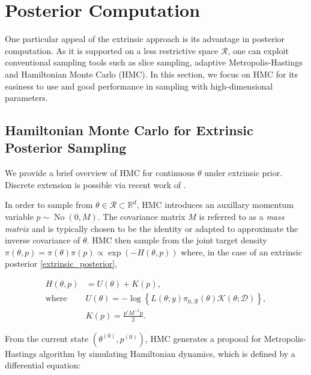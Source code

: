 \documentclass[10pt]{article}
\newcommand{\mc}[1]{\mathcal{#1}}
\DeclareMathOperator{\No}{No}
\DeclareMathOperator{\1}{\mathbbm{1}}
\newcommand{\mass}{M} %
\begin{document}
\section{Posterior Computation}

One particular appeal of the extrinsic approach is its advantage in posterior computation. As it is supported on a less restrictive space $\mc R$, one can exploit conventional sampling tools such as slice sampling, adaptive Metropolis-Hastings and Hamiltonian Monte Carlo (HMC). In this section, we focus on HMC for its easiness to use and good performance in sampling with high-dimensional parameters.

\subsection{Hamiltonian Monte Carlo for Extrinsic Posterior Sampling}

We provide a brief overview of HMC for continuous $\theta$ under extrinsic prior. Discrete extension is possible via recent work of \cite{nishimura2017discontinuous}.

In order to sample from $\theta\in\mc R \subset \mathbb R^d$, HMC introduces an auxillary momentum variable $p \sim \No(0, \mass)$. The covariance matrix $\mass$ is referred to as a \textit{mass matrix} and is typically chosen to be the identity or adapted to approximate the inverse covariance of $\theta$. HMC then sample from the joint target density $\pi(\theta, p) = \pi(\theta) \pi(p) \propto \exp (- H(\theta, p))$ where, in the case of an extrinsic posterior \eqref{extrinsic_posterior}, 


\begin{equation}
\begin{aligned}
H(\theta, p)& = U(\theta)+K(p),\\
\text{where } & U(\theta) = -\log\left\{ L(\theta;y)\pi_{0,\mc R}(\theta) \mc{K}(\theta;\mc D) \right\},\\
& K(p) = \frac{p'\mass^{-1} p}{2}.
\end{aligned}
\end{equation}

From the current state $(\theta^{(0)},p^{(0)})$, HMC generates a proposal for Metropolis-Hastings algorithm by simulating Hamiltonian dynamics, which is defined by a differential equation:
\end{document}
